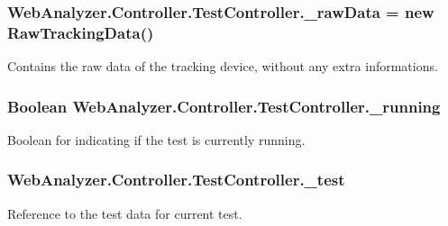 \subsubsection[{\+\_\+raw\+Data}]{ Web\+Analyzer.\+Controller.\+Test\+Controller.\+\_\+raw\+Data = new {\bf Raw\+Tracking\+Data}()\hspace{0.3cm}{\ttfamily [private]}}\label{class_web_analyzer_1_1_controller_1_1_test_controller_ac2155d50816dddd7e62689655d3a978f}


Contains the raw data of the tracking device, without any extra informations. 

\hypertarget{class_web_analyzer_1_1_controller_1_1_test_controller_a49aaaa975ccbeedcd52fb03288cea3ef}{}
\subsubsection[{\+\_\+running}]{\setlength{\rightskip}{0pt plus 5cm}Boolean Web\+Analyzer.\+Controller.\+Test\+Controller.\+\_\+running\hspace{0.3cm}{\ttfamily [private]}}\label{class_web_analyzer_1_1_controller_1_1_test_controller_a49aaaa975ccbeedcd52fb03288cea3ef}


Boolean for indicating if the test is currently running. 

\hypertarget{class_web_analyzer_1_1_controller_1_1_test_controller_a6084bcc401d37f7f8861fc0e9fb771b6}{}
\subsubsection[{\+\_\+test}]{ Web\+Analyzer.\+Controller.\+Test\+Controller.\+\_\+test\hspace{0.3cm}{\ttfamily [private]}}\label{class_web_analyzer_1_1_controller_1_1_test_controller_a6084bcc401d37f7f8861fc0e9fb771b6}


Reference to the test data for current test. 

